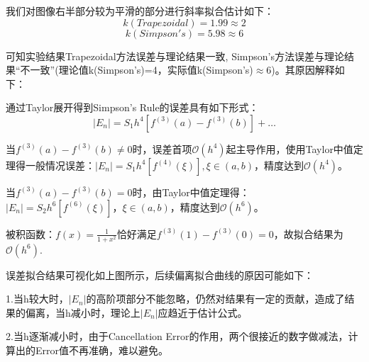 \documentclass[12pt,a4paper]{article}%
\begin{document}
    我们对图像右半部分较为平滑的部分进行斜率拟合估计如下：
    \[k(Trapezoidal) = 1.99\approx 2\]
    \[k(Simpson's) = 5.98\approx 6\]

    可知实验结果Trapezoidal方法误差与理论结果一致, Simpson's方法误差与理论结果“不一致”(理论值k(Simpson's)=4，实际值k(Simpson's)$\approx$6)。其原因解释如下：

    通过Taylor展开得到Simpson’s Rule的误差具有如下形式：
    \[|E_n| = S_1 h^4\left[f^{(3)}(a)-f^{(3)}(b)\right]+\dots\]

    当$f^{(3)} (a)-f^{(3)} (b)≠0$时，误差首项$\mathcal{O} (h^4)$起主导作用，使用Taylor中值定理得一般情况误差：$|E_n|= S_1 h^4 [f^{(4)} (ξ)],ξ∈(a,b)$，精度达到$\mathcal{O} (h^4)$。

    当$f^{(3)} (a)-f^{(3)} (b)=0$时，由Taylor中值定理得：$|E_n |=S_2 h^6 [f^{(6)} (ξ)]，ξ∈(a,b)$，精度达到$\mathcal{O} (h^6)$。

    被积函数：$f(x)=\frac{1}{1+x^2}$恰好满足$f^{(3)} (1)-f^{(3)} (0)=0$，故拟合结果为$\mathcal{O} (h^6)$.

    误差拟合结果可视化如上图所示，后续偏离拟合曲线的原因可能如下：

    1.当h较大时，$|E_n|$的高阶项部分不能忽略，仍然对结果有一定的贡献，造成了结果的偏离，当h减小时，理论上$|E_n|$应趋近于估计公式。

    2.当h逐渐减小时，由于Cancellation Error的作用，两个很接近的数字做减法，计算出的Error值不再准确，难以避免。
\end{document}
